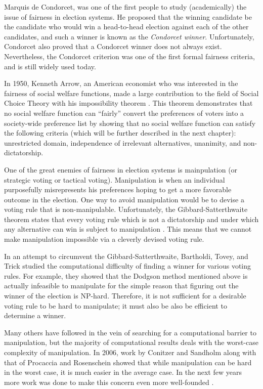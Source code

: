 	Marquis de Condorcet, was one of the first people to study (academically) the issue of fairness in election systems. He proposed that the winning candidate be the candidate who would win a head-to-head election against each of the other candidates, and such a winner is known as the \emph{Condorcet winner}. Unfortunately, Condorcet also proved that a Condorcet winner does not always exist. Nevertheless, the Condorcet criterion was one of the first formal fairness criteria, and is still widely used today.

	In 1950, Kenneth Arrow, an American economist who was interested in the fairness of social welfare functions, made a large contribution to the field of Social Choice Theory with his impossibility theorem \cite{arrow1950difficulty, arrow1963social}. This theorem demonstrates that no social welfare function can ``fairly'' convert the preferences of voters into a society-wide preference list by showing that no social welfare function can satisfy the following criteria (which will be further described in the next chapter): unrestricted domain, independence of irrelevant alternatives, unanimity, and non-dictatorship.

	One of the great enemies of fairness in election systems is mainpulation (or strategic voting or tactical voting). Manipulation is when an individual purposefully misrepresents his preferences hoping to get a more favorable outcome in the election. One way to avoid manipulation would be to devise a voting rule that is non-manipulable. Unfortunately, the Gibbard-Satterthwaite theorem states that every voting rule which is not a dictatorship and under which any alternative can win is subject to manipulation \cite{gibbard1973manipulation, satterthwaite1975strategy, duggan2000strategic}. This means that we cannot make manipulation impossible via a cleverly devised voting rule.

	In an attempt to circumvent the Gibbard-Satterthwaite, Bartholdi, Tovey, and Trick studied the computational difficulty of finding a winner for various voting rules. For example, they showed that the Dodgson method mentioned above \cite{dodgson1876method} is actually infeasible to manipulate for the simple reason that figuring out the winner of the election is NP-hard. Therefore, it is not sufficient for a desirable voting rule to be hard to manipulate; it must also be also be efficient to determine a winner.

	Many others have followed in the vein of searching for a computational barrier to manipulation, but the majority of computational results deals with the worst-case complexity of manipulation. In 2006, work by Conitzer and Sandholm \cite{conitzer2006nonexistence} along with that of Procaccia and Rosenschein \cite{procaccia2006junta} showed that while manipulation can be hard in the worst case, it is much easier in the average case. In the next few years more work was done to make this concern even more well-founded \cite{procaccia2007average, erdelyi2007approximating}.

